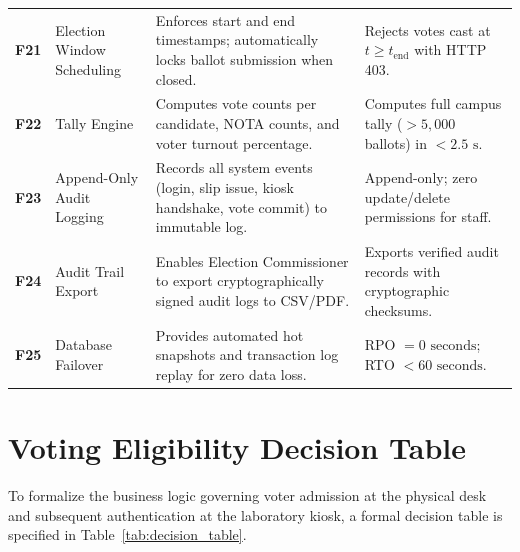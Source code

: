 \documentclass[12pt,a4paper,oneside]{report}
\begin{document}
\begin{longtable}{p{1.8cm} p{4.2cm} p{4.8cm} p{3.2cm}}
    \textbf{F21} & Election Window Scheduling & Enforces start and end timestamps; automatically locks ballot submission when closed. & Rejects votes cast at $t \ge t_{\text{end}}$ with HTTP 403. \\
    \textbf{F22} & Tally Engine & Computes vote counts per candidate, NOTA counts, and voter turnout percentage. & Computes full campus tally ($>5,000$ ballots) in $<2.5\text{ s}$. \\
    \textbf{F23} & Append-Only Audit Logging & Records all system events (login, slip issue, kiosk handshake, vote commit) to immutable log. & Append-only; zero update/delete permissions for staff. \\
    \textbf{F24} & Audit Trail Export & Enables Election Commissioner to export cryptographically signed audit logs to CSV/PDF. & Exports verified audit records with cryptographic checksums. \\
    \textbf{F25} & Database Failover & Provides automated hot snapshots and transaction log replay for zero data loss. & RPO $= 0\text{ seconds}$; RTO $< 60\text{ seconds}$. \\
\end{longtable}

\section{Voting Eligibility Decision Table}
To formalize the business logic governing voter admission at the physical desk and subsequent authentication at the laboratory kiosk, a formal decision table is specified in Table~\ref{tab:decision_table}.
\end{document}
